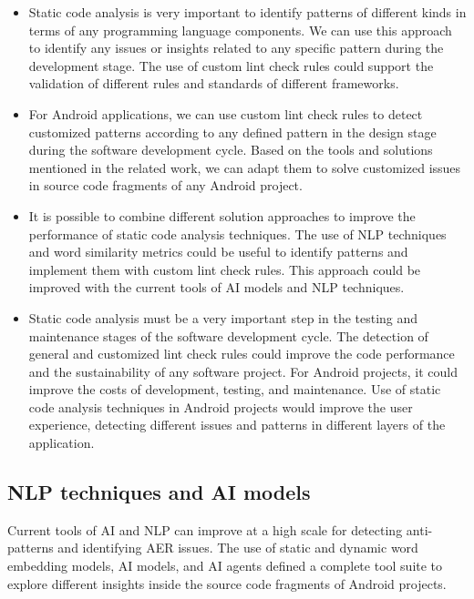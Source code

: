 \begin{itemize}
	\item Static code analysis is very important to identify patterns of different kinds in terms of any programming language components. We can use this approach to identify any issues or insights related to any specific pattern during the development stage. The use of custom lint check rules could support the validation of different rules and standards of different frameworks.
	\item For Android applications, we can use custom lint check rules to detect customized patterns according to any defined pattern in the design stage during the software development cycle. Based on the tools and solutions mentioned in the related work, we can adapt them to solve customized issues in source code fragments of any Android project.
	\item It is possible to combine different solution approaches to improve the performance of static code analysis techniques. The use of NLP techniques and word similarity metrics could be useful to identify patterns and implement them with custom lint check rules. This approach could be improved with the current tools of AI models and NLP techniques.
	\item Static code analysis must be a very important step in the testing and maintenance stages of the software development cycle. The detection of general and customized lint check rules could improve the code performance and the sustainability of any software project. For Android projects, it could improve the costs of development, testing, and maintenance. Use of static code analysis techniques in Android projects would improve the user experience, detecting different issues and patterns in different layers of the application.
\end{itemize}


\subsection{NLP techniques and AI models}
Current tools of AI and NLP can improve at a high scale for detecting anti-patterns and identifying AER issues. The use of static and dynamic word embedding models, AI models, and AI agents defined a complete tool suite to explore different insights inside the source code fragments of Android projects.

